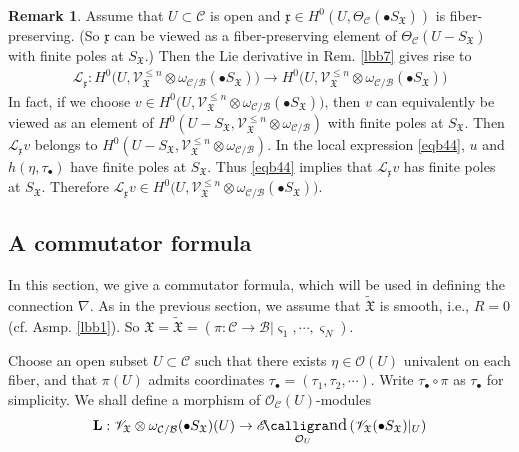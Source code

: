 \documentclass[11pt,b5paper,notitlepage]{article}
\theoremstyle{definition}
\newtheorem{rem}[df]{Remark}
\theoremstyle{plain}
\newcommand{\fk}{\mathfrak}
\newcommand{\mc}{\mathcal}
\newcommand{\wtd}{\widetilde}
\newcommand{\Lbf}{\mathbf{L}}
\newcommand{\ML}{\mathcal{L}}
\newcommand{\SV}{\mathscr{V}}
\newcommand{\xk}{\mathfrak x}
\newcommand{\sgm}{\varsigma}
\newcommand{\SX}{{S_{\fk X}}}
\newcommand{\blt}{\bullet}
\newcommand{\<}{\left\langle}
\renewcommand{\>}{\right\rangle}
\newcommand{\MO}{\mathcal{O}}
\newcommand{\MC}{\mathcal{C}}
\newcommand{\MB}{\mathcal{B}}
\newcommand{\fx}{\mathfrak{X}}
\DeclareMathOperator{\send}{\mathscr{E}\text{\kern -3pt {\calligra\large nd}}\,}
\numberwithin{equation}{section}
\begin{document}
\begin{rem}\label{lieder1}
Assume that $U\subset \mc C$ is open and $\xk\in H^0(U,\Theta_\MC(\blt\SX))$ is fiber-preserving. (So $\xk$ can be viewed as a fiber-preserving element of $\Theta_\MC(U-\SX)$ with finite poles at $\SX$.) Then the Lie derivative in Rem. \ref{lbb7} gives rise to
\begin{align}\label{eqb26}
    \ML_\xk:H^0\big(U,\SV_\fx^{\leq n}\otimes \omega_{\MC/\MB}(\blt S_\fx)\big)\rightarrow H^0\big(U,\SV_\fx^{\leq n}\otimes \omega_{\MC/\MB}(\blt S_\fx)\big)
\end{align}
In fact, if we choose $v\in H^0\big(U,\SV_\fx^{\leq n}\otimes \omega_{\MC/\MB}(\blt S_\fx)\big)$, then $v$ can equivalently be viewed as an element of $H^0(U-\SX,\SV_\fx^{\leq n}\otimes \omega_{\MC/\MB})$ with finite poles at $\SX$. Then $\mc L_\xk v$ belongs to  $H^0(U-\SX,\SV_\fx^{\leq n}\otimes \omega_{\MC/\MB})$. In the local expression \eqref{eqb44}, $u$ and $h(\eta,\tau_\blt)$ have finite poles at $\SX$. Thus \eqref{eqb44} implies that $\mc L_\xk v$ has finite poles at $\SX$. Therefore $\mc L_\xk v\in H^0\big(U,\SV_\fx^{\leq n}\otimes \omega_{\MC/\MB}(\blt S_\fx)\big)$.
\end{rem}




\subsection{A commutator formula}
In this section, we give a commutator formula, which will be used in defining the connection $\nabla$. As in the previous section, we assume that $\wtd{\fk X}$ is smooth, i.e., $R=0$ (cf. Asmp. \ref{lbb1}). So  $\fx=\wtd{\fx}=(\pi:\MC\rightarrow\MB\big| \sgm_1,\cdots,\sgm_N)$. 

Choose an open subset $U\subset \MC$ such that there exists $\eta\in\mc O(U)$ univalent on each fiber, and that $\pi(U)$ admits coordinates $\tau_\blt=(\tau_1,\tau_2,\cdots)$. Write $\tau_\blt\circ \pi$ as $\tau_\blt$ for simplicity.   We shall define a morphism of $\MO_\MC(U)$-modules
\begin{align}\label{commutator1}
    \Lbf:\SV_\fx\otimes \omega_{\MC/\MB}(\blt S_\fx)(U)\rightarrow\send_{\MO_U}(\SV_\fx(\bullet S_{\mathfrak{X}})\vert_U)
\end{align}
\end{document}
